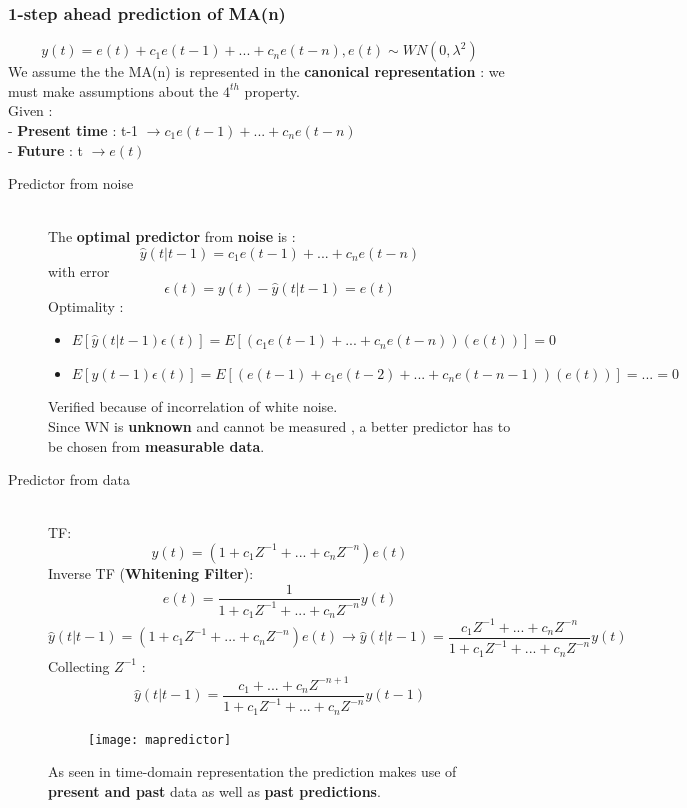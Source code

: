 \subsubsection{1-step ahead prediction of MA(n)}
$$ y(t) = e(t) + c_1e(t-1)+...+c_ne(t-n) , e(t) \sim WN(0,\lambda^2)$$
We assume the the MA(n) is represented in the \textbf{canonical representation} : we must make assumptions about the $4^{th}$ property.\\
Given :\\
- \textbf{Present time} : t-1 $\to c_1e(t-1)+...+c_ne(t-n)$\\
- \textbf{Future} : t $\to e(t)$\\
\begin{description}
\item[Predictor from noise]\hfill\\
The \textbf{optimal predictor} from \textbf{noise} is :
\[
\boxed{\hat{y}(t|t-1)=c_1e(t-1)+...+c_ne(t-n)}
\]
with error 
\[
\boxed{\epsilon(t) = y(t) - \hat{y}(t|t-1) = e(t)}
\]
Optimality :
\begin{itemize}
\item $E[\hat{y}(t|t-1)\epsilon(t)]= E[(c_1e(t-1)+...+c_ne(t-n))(e(t))]=0 $
\item $E[y(t-1)\epsilon(t)]=E[(e(t-1)+c_1e(t-2)+...+c_ne(t-n-1))(e(t))]=...=0$ 
\end{itemize}
Verified because of incorrelation of white noise.\\
Since WN is \textbf{unknown} and cannot be measured , a better predictor has to be chosen from \textbf{measurable data}.

\item[Predictor from data]\hfill\\
TF:
$$ y(t) = (1+c_1Z^{-1}+...+c_nZ^{-n})e(t)$$
Inverse TF (\textbf{Whitening Filter}):
$$ e(t) = \frac{1}{1+c_1Z^{-1}+...+c_nZ^{-n}}y(t)$$
$$ \hat{y}(t|t-1) = (1+c_1Z^{-1}+...+c_nZ^{-n})e(t) \to \hat{y}(t|t-1) = \frac{c_1Z^{-1}+...+c_nZ^{-n}}{1+c_1Z^{-1}+...+c_nZ^{-n}}y(t) $$
Collecting $Z^{-1}$ :
\[
\boxed{\hat{y}(t|t-1) = \frac{c_1+...+c_nZ^{-n+1}}{1+c_1Z^{-1}+...+c_nZ^{-n}}y(t-1)}
\]
\begin{figure}[H]
 \centering
  \texttt{[image: mapredictor]}
\end{figure}
As seen in time-domain representation the prediction makes use of \textbf{present and past} data as well as \textbf{past predictions}.
\end{description}

